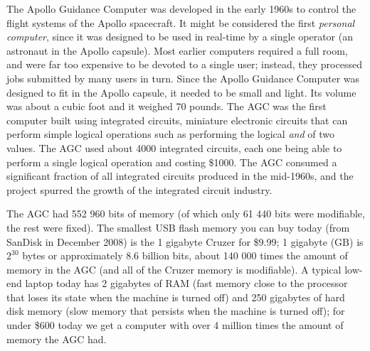 The Apollo Guidance Computer was developed in the early 1960s to control the flight systems of the Apollo spacecraft.  It might be considered the first {\em personal computer}, since it was designed to be used in real-time by a single operator (an astronaut in the Apollo capsule).  Most earlier computers required a full room, and were far too expensive to be devoted to a single user; instead, they processed jobs submitted by many users in turn.  Since the Apollo Guidance Computer was designed to fit in the Apollo capsule, it needed to be small and light.  Its volume was about a cubic foot and it weighed 70 pounds.   
The AGC was the first computer built using integrated circuits, miniature electronic circuits that can perform simple logical operations such as performing the logical \emph{and} of two values.  The AGC used about 4000 integrated circuits, each one being able to perform a single logical operation and costing \$1000.  The AGC consumed a significant fraction of all integrated circuits produced in the mid-1960s, and the project spurred the growth of the integrated circuit industry. 


The AGC had 552 960 bits of memory (of which only 61 440 bits were modifiable, the rest were fixed).  The smallest USB flash memory you can buy today (from SanDisk in December 2008) is the 1 gigabyte Cruzer for \$9.99; 1 gigabyte (GB) is $2^{30}$ bytes or approximately 8.6 billion bits, about 140 000 times the amount of memory in the AGC (and all of the Cruzer memory is modifiable).  
A typical low-end laptop today has 2 gigabytes of RAM (fast memory close to the processor that loses its state when the machine is turned off) and 250 gigabytes of hard disk memory (slow memory that persists when the machine is turned off); for under \$600 today we get a computer with over 4 million times the amount of memory the AGC had. 

